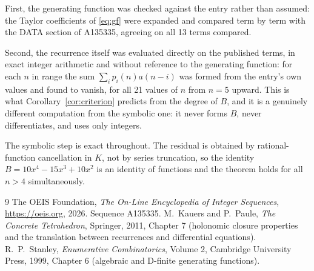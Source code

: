 \documentclass[11pt,a4paper]{article}
\theoremstyle{plain}
\theoremstyle{definition}
\begin{document}
First, the generating function was checked against the entry rather than assumed: the
Taylor coefficients of \eqref{eq:gf} were expanded and compared term by term with the DATA
section of A135335, agreeing on all 13 terms compared.

Second, the recurrence itself was evaluated directly on the published terms, in exact
integer arithmetic and without reference to the generating function: for each $n$ in range
the sum $\sum_{i}p_{i}(n)a(n-i)$ was formed from the entry's own values and found to
vanish, for all 21 values of $n$ from $n=5$ upward. This is what
Corollary~\ref{cor:criterion} predicts from the degree of $B$, and it is a genuinely
different computation from the symbolic one: it never forms $B$, never differentiates, and
uses only integers.

The symbolic step is exact throughout. The residual is obtained by rational-function
cancellation in $K$, not by series truncation, so the identity $B=10 x^{4} - 15 x^{3} + 10 x^{2}$ is an
identity of functions and the theorem holds for all $n>4$ simultaneously.

\begin{thebibliography}{9}
 The OEIS Foundation, \emph{The On-Line Encyclopedia of Integer Sequences},
\url{https://oeis.org}, 2026. Sequence A135335.
 M.~Kauers and P.~Paule, \emph{The Concrete Tetrahedron}, Springer, 2011,
Chapter 7 (holonomic closure properties and the translation between recurrences and
differential equations).
 R.~P.~Stanley, \emph{Enumerative Combinatorics}, Volume 2, Cambridge
University Press, 1999, Chapter 6 (algebraic and D-finite generating functions).
\end{thebibliography}
\end{document}
